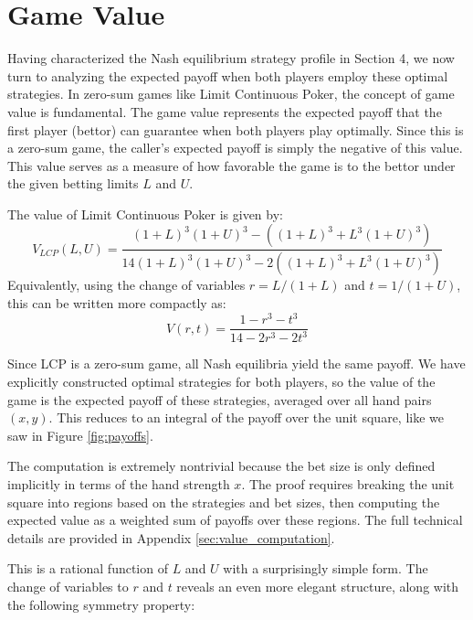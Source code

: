 \documentclass[../../main/main.tex]{subfiles}
\begin{document}
\section{Game Value}
\label{sec:game_value}

Having characterized the Nash equilibrium strategy profile in Section 4, we now turn to analyzing the expected payoff when both players employ these optimal strategies. In zero-sum games like Limit Continuous Poker, the concept of game value is fundamental. The game value represents the expected payoff that the first player (bettor) can guarantee when both players play optimally. Since this is a zero-sum game, the caller's expected payoff is simply the negative of this value. This value serves as a measure of how favorable the game is to the bettor under the given betting limits $L$ and $U$.

\begin{theorem}
    \label{thm:game_value}
    The value of Limit Continuous Poker is given by:
    \[
        V_{LCP}(L, U) = \frac{(1 + L)^3(1+U)^3 - ((1+L)^3+L^3(1 + U)^3)}{14(1 + L)^3(1+U)^3 - 2((1+L)^3+L^3(1 + U)^3)}
    \]
    Equivalently, using the change of variables $r = L/(1+L)$ and $t = 1/(1+U)$, this can be written more compactly as:
    \[
        V(r, t) = \frac{1 - r^3 - t^3}{14 - 2r^3 - 2t^3}
    \]
\end{theorem}

\begin{customproof}
    Since LCP is a zero-sum game, all Nash equilibria yield the same payoff. We have explicitly constructed optimal strategies for both players, so the value of the game is the expected payoff of these strategies, averaged over all hand pairs $(x, y)$. This reduces to an integral of the payoff over the unit square, like we saw in Figure \ref{fig:payoffs}. 
    
    The computation is extremely nontrivial because the bet size is only defined implicitly in terms of the hand strength $x$. The proof requires breaking the unit square into regions based on the strategies and bet sizes, then computing the expected value as a weighted sum of payoffs over these regions. The full technical details are provided in Appendix \ref{sec:value_computation}.
\end{customproof}

This is a rational function of $L$ and $U$ with a surprisingly simple form. The change of variables to $r$ and $t$ reveals an even more elegant structure, along with the following symmetry property:
\end{document}
